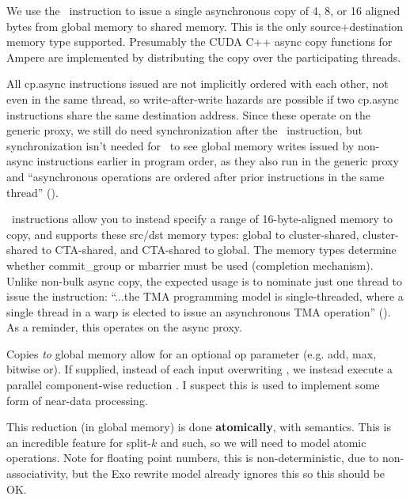 \filbreak
{} We use the \cpAsync\ instruction to issue a single asynchronous copy of 4, 8, or 16 aligned bytes from global memory to shared memory. This is the only source+destination memory type supported. Presumably the CUDA C++ async copy functions for Ampere are implemented by distributing the copy over the participating threads.

All cp.async instructions issued are not implicitly ordered with each other, not even in the same thread, so write-after-write hazards are possible if two cp.async instructions share the same destination address. Since these operate on the generic proxy, we still do need synchronization after the \cpAsync\ instruction, but synchronization isn't needed for \cpAsync\ to see global memory writes issued by non-async instructions earlier in program order, as they also run in the generic proxy and ``asynchronous operations are ordered after prior instructions in the same thread'' ().

\filbreak
{} \cpAsyncBulk\ instructions allow you to instead specify a range of 16-byte-aligned memory to copy, and supports these src/dst memory types: global to cluster-shared, cluster-shared to CTA-shared, and CTA-shared to global. The memory types determine whether commit\_group or mbarrier must be used (completion mechanism). Unlike non-bulk async copy, the expected usage is to nominate just one thread to issue the instruction: ``...the TMA programming model is single-threaded, where a single thread in a warp is elected to issue an asynchronous TMA operation'' (\hopperBlog). As a reminder, this operates on the async proxy.

\filbreak
Copies \textit{to} global memory allow for an optional  op parameter (e.g. add, max, bitwise or).
If supplied, instead of each input  overwriting , we instead execute a parallel component-wise reduction .
I suspect this is used to implement some form of near-data processing.

\filbreak
This reduction (in global memory) is done \textbf{atomically}, with  semantics.
This is an incredible feature for split-$k$ and such, so we will need to model atomic operations.
Note for floating point numbers, this is non-deterministic, due to non-associativity, but the Exo rewrite model already ignores this so this should be OK.

